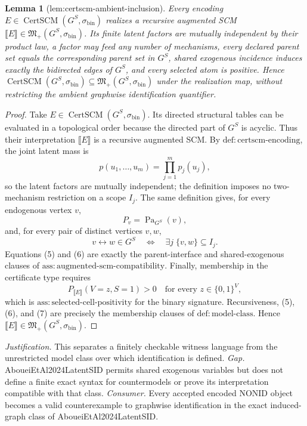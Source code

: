 \documentclass{article}
\newtheorem{lemma}{Lemma}
\begin{document}
\begin{lemma}[lem:certscm-ambient-inclusion]\label{lem:certscm-ambient-inclusion}
Every encoding \(E\in\operatorname{CertSCM}(G^S,\sigma_{\mathrm{bin}})\) realizes a recursive augmented SCM \(\llbracket E\rrbracket\in\mathfrak M_+(G^S,\sigma_{\mathrm{bin}})\). Its finite latent factors are mutually independent by their product law, a factor may feed any number of mechanisms, every declared parent set equals the corresponding parent set in \(G^S\), shared exogenous incidence induces exactly the bidirected edges of \(G^S\), and every selected atom is positive. Hence \(\operatorname{CertSCM}(G^S,\sigma_{\mathrm{bin}})\subseteq\mathfrak M_+(G^S,\sigma_{\mathrm{bin}})\) under the realization map, without restricting the ambient graphwise identification quantifier.
\end{lemma}
\begin{proof}
Take \(E\in\operatorname{CertSCM}(G^S,\sigma_{\mathrm{bin}})\).  Its directed structural tables can be evaluated in a topological order because the directed part of \(G^S\) is acyclic.  Thus their interpretation \(\llbracket E\rrbracket\) is a recursive augmented SCM.  By \(\mathrm{def:certscm\text{-}encoding}\), the joint latent mass is
\[
  p(u_1,\ldots,u_m)=\prod_{j=1}^m p_j(u_j),
\]
so the latent factors are mutually independent; the definition imposes no two-mechanism restriction on a scope \(I_j\).  The same definition gives, for every endogenous vertex \(v\),
\[
  P_v=\operatorname{Pa}_{G^S}(v), \tag{5}
\]
and, for every pair of distinct vertices \(v,w\),
\[
 v\leftrightarrow w\in G^S
 \quad\Longleftrightarrow\quad
 \exists j\;\{v,w\}\subseteq I_j. \tag{6}
\]
Equations (5) and (6) are exactly the parent-interface and shared-exogenous clauses of \(\mathrm{ass:augmented\text{-}scm\text{-}compatibility}\).  Finally, membership in the certificate type requires
\[
 P_{\llbracket E\rrbracket}(V=z,S=1)>0
 \quad\text{for every }z\in\{0,1\}^{V}, \tag{7}
\]
which is \(\mathrm{ass:selected\text{-}cell\text{-}positivity}\) for the binary signature.  Recursiveness, (5), (6), and (7) are precisely the membership clauses of \(\mathrm{def:model\text{-}class}\).  Hence \(\llbracket E\rrbracket\in\mathfrak M_+(G^S,\sigma_{\mathrm{bin}})\).
\end{proof}
\par\smallskip\noindent \textit{Justification.} This separates a finitely checkable witness language from the unrestricted model class over which identification is defined. \textit{Gap.} AboueiEtAl2024LatentSID permits shared exogenous variables but does not define a finite exact syntax for countermodels or prove its interpretation compatible with that class. \textit{Consumer.} Every accepted encoded NONID object becomes a valid counterexample to graphwise identification in the exact induced-graph class of AboueiEtAl2024LatentSID.
\end{document}
